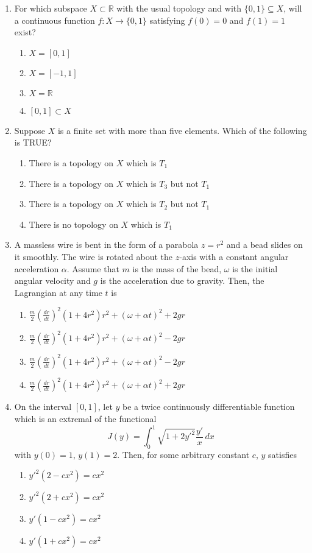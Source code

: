 \documentclass[journal,12pt,onecolumn]{IEEEtran}
\theoremstyle{remark}
\begin{document}
\begin{enumerate}
    \item For which subspace $X \subset \mathbb{R}$ with the usual topology and with $\{0,1\} \subseteq X$, will a continuous function $f : X \rightarrow \{0,1\}$ satisfying $f(0) = 0$ and $f(1) = 1$ exist?
    \begin{enumerate}
    	\item $X = [0,1]$
    	\item $X = [-1,1]$
    	\item $X = \mathbb{R}$
    	\item $[0,1] \subset X$
    \end{enumerate}
    
    \item Suppose $X$ is a finite set with more than five elements. Which of the following is TRUE?
    \begin{enumerate}
    	\item There is a topology on $X$ which is $T_1$
    	\item There is a topology on $X$ which is $T_3$ but not $T_1$
    	\item There is a topology on $X$ which is $T_2$ but not $T_1$
    	\item There is no topology on $X$ which is $T_1$
    \end{enumerate}
    
    \item A massless wire is bent in the form of a parabola $z = r^2$ and a bead slides on it smoothly. The wire is rotated about the $z$-axis with a constant angular acceleration $\alpha$. Assume that $m$ is the mass of the bead, $\omega$ is the initial angular velocity and $g$ is the acceleration due to gravity. Then, the Lagrangian at any time $t$ is
    \begin{enumerate}
    	\item $ \frac{m}{2} \left( \frac{d r}{d t} \right)^2 (1 + 4r^2) r^2 + (\omega + \alpha t)^2 + 2gr$
    	\item $ \frac{m}{2} \left( \frac{d r}{d t} \right)^2 (1 + 4r^2) r^2 + (\omega + \alpha t)^2 - 2gr$
    	\item $ \frac{m}{2} \left( \frac{d r}{d t} \right)^2 (1 + 4r^2) r^2 + (\omega + \alpha t)^2 - 2gr$
    	\item $ \frac{m}{2} \left( \frac{d r}{d t} \right)^2 (1 + 4r^2) r^2 + (\omega + \alpha t)^2 + 2gr$
    \end{enumerate}
    
    \item On the interval $[0, 1]$, let $y$ be a twice continuously differentiable function which is an extremal of the functional
    $$ J(y) = \int_0^1 \sqrt{1 + 2y'^2} \frac{y'}{x} \, dx $$
    with $y(0) = 1$, $y(1) = 2$. Then, for some arbitrary constant $c$, $y$ satisfies
    \begin{enumerate}
    	\item $y'^2 (2 - c x^2) = c x^2$
    	\item $y'^2 (2 + c x^2) = c x^2$
    	\item $y' (1 - c x^2) = c x^2$
    	\item $y' (1 + c x^2) = c x^2$
    \end{enumerate}


\end{enumerate}
\end{document}
